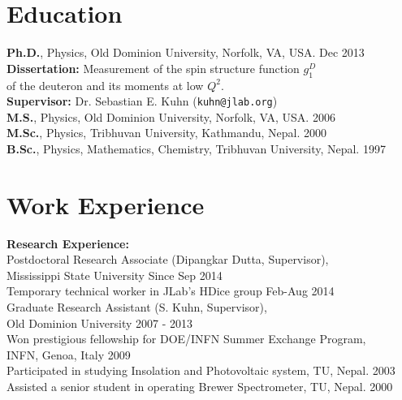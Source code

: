 \documentclass[10pt, letterpaper]{article}
\newcommand{\years}[1]{\marginnote{\small #1}} %
\begin{document}
\section*{Education}
\noindent
    \textbf{Ph.D.}, Physics, Old Dominion University, Norfolk, VA, USA.  \hfill Dec 2013\\
       \hspace*{5 mm} \textbf{Dissertation:} Measurement of the spin structure function $g^D_{1}$ \\
       \hspace*{10 mm} of the deuteron and its moments at low $Q^2$. \\
       \hspace*{5 mm} \textbf{Supervisor:} Dr. Sebastian E. Kuhn (\texttt{kuhn@jlab.org}) \\
    \textbf{M.S.}, Physics, Old Dominion University, Norfolk, VA, USA. \hfill 2006 \\ 
    \textbf{M.Sc.}, Physics, Tribhuvan University, Kathmandu, Nepal. \hfill 2000 \\ 
    \textbf{B.Sc.}, Physics, Mathematics, Chemistry, Tribhuvan University, Nepal. \hfill 1997 %


\section*{Work Experience}
\noindent
		{\bf Research Experience:} \\
		Postdoctoral Research Associate (Dipangkar Dutta, Supervisor), \\
		 \hspace*{3 mm} Mississippi State University \hfill Since Sep 2014 \\
	    Temporary technical worker in JLab's HDice group \hfill Feb-Aug 2014\\
		Graduate Research Assistant (S. Kuhn, Supervisor), \\
		\hspace*{3 mm} Old Dominion University \hfill 2007 - 2013 \\
		Won prestigious fellowship for DOE/INFN Summer Exchange Program, \\
		\hspace*{3 mm} INFN, Genoa, Italy \hfill 2009 \\
		Participated in studying Insolation and Photovoltaic system, TU, Nepal. \hfill 2003 \\
		Assisted a senior student in operating Brewer Spectrometer, TU, Nepal. \hfill 2000 \\
\end{document}
